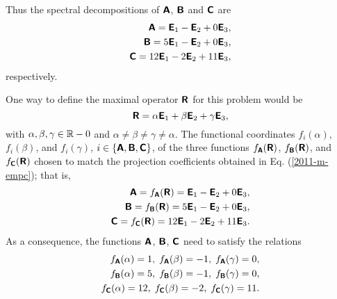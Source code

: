 {\begin{equation}
\end{equation}
Thus the spectral decompositions of
$\textsf{\textbf{A}}$,
$\textsf{\textbf{B}}$  and
$\textsf{\textbf{C}}$ are
\begin{equation}
\begin{split}
\textsf{\textbf{A}}= \textsf{\textbf{E}}_1  - \textsf{\textbf{E}}_2  + 0  \textsf{\textbf{E}}_3,\\
\textsf{\textbf{B}}= 5\textsf{\textbf{E}}_1  - \textsf{\textbf{E}}_2  + 0 \textsf{\textbf{E}}_3,\\
\textsf{\textbf{C}}= 12\textsf{\textbf{E}}_1  -2 \textsf{\textbf{E}}_2  + 11\textsf{\textbf{E}}_3,
\end{split}
\label{2011-m-empc}
\end{equation}
respectively.


One way to define the  maximal operator  $\textsf{\textbf{R}}$ for this problem
would be
$$
\textsf{\textbf{R}} = \alpha \textsf{\textbf{E}}_1  + \beta \textsf{\textbf{E}}_2  + \gamma  \textsf{\textbf{E}}_3,
$$
with
$\alpha ,  \beta ,   \gamma \in {\Bbb R}-0$ and
$\alpha  \neq \beta  \neq   \gamma \neq \alpha  $.
The functional coordinates
$f_i(\alpha )$, $f_i(\beta)$, and $f_i(\gamma)$,
$i\in \{\textsf{\textbf{A}},\textsf{\textbf{B}},\textsf{\textbf{C}}\}$,  of the three functions
$ f_\textsf{\textbf{A}}(\textsf{\textbf{R}})$,
$ f_\textsf{\textbf{B}}(\textsf{\textbf{R}})$, and
$ f_\textsf{\textbf{C}}(\textsf{\textbf{R}})$
chosen to match the projection coefficients obtained in Eq. (\ref{2011-m-empc});
that is,
\begin{equation}
\begin{split}
\textsf{\textbf{A}}= f_\textsf{\textbf{A}}(\textsf{\textbf{R}})=  \textsf{\textbf{E}}_1  - \textsf{\textbf{E}}_2  + 0  \textsf{\textbf{E}}_3,\\
\textsf{\textbf{B}}=  f_\textsf{\textbf{B}}(\textsf{\textbf{R}})= 5\textsf{\textbf{E}}_1  - \textsf{\textbf{E}}_2  + 0 \textsf{\textbf{E}}_3,\\
\textsf{\textbf{C}}=  f_\textsf{\textbf{C}}(\textsf{\textbf{R}})= 12\textsf{\textbf{E}}_1  -2 \textsf{\textbf{E}}_2  + 11\textsf{\textbf{E}}_3.
\end{split}
\end{equation}
As a consequence, the functions
$\textsf{\textbf{A}}$,
$\textsf{\textbf{B}}$,
$\textsf{\textbf{C}}$ need to satisfy the relations
\begin{equation}
\begin{split}
f_\textsf{\textbf{A}}(\alpha ) =1,\; f_\textsf{\textbf{A}}(\beta ) =-1,\; f_\textsf{\textbf{A}}(\gamma ) =0,\\
f_\textsf{\textbf{B}}(\alpha ) =5,\; f_\textsf{\textbf{B}}(\beta ) =-1,\; f_\textsf{\textbf{B}}(\gamma ) =0,\\
f_\textsf{\textbf{C}}(\alpha ) =12,\; f_\textsf{\textbf{C}}(\beta ) =-2,\; f_\textsf{\textbf{C}}(\gamma ) =11.
\end{split}
\label{2011-m-empc-fsr}
\end{equation}

\eexample
}


